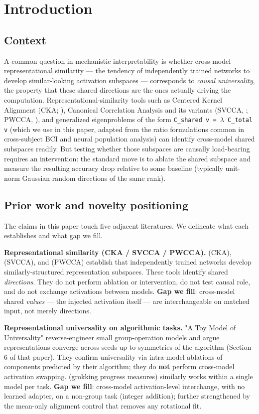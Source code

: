 \section{Introduction}

\subsection{Context}

A common question in mechanistic interpretability is whether
cross-model representational similarity --- the tendency of independently
trained networks to develop similar-looking activation subspaces ---
corresponds to \emph{causal universality}, the property that these shared
directions are the ones actually driving the computation.
Representational-similarity tools such as Centered Kernel Alignment
(CKA; \citet{kornblith2019cka}), Canonical Correlation Analysis and its
variants (SVCCA, \citet{raghu2017svcca}; PWCCA, \citet{morcos2018pwcca}), and
generalized eigenproblems of the form \texttt{C\_shared v = $\lambda$ C\_total v} (which
we use in this paper, adapted from the ratio formulations common in
cross-subject BCI and neural population analysis) can identify
cross-model shared subspaces readily. But testing whether those
subspaces are causally load-bearing requires an intervention: the
standard move is to ablate the shared subspace and measure the
resulting accuracy drop relative to some baseline (typically unit-norm
Gaussian random directions of the same rank).

\subsection{Prior work and novelty positioning}

The claims in this paper touch five adjacent literatures. We delineate
what each establishes and what gap we fill.

\textbf{Representational similarity (CKA / SVCCA / PWCCA).} \citet{kornblith2019cka} (CKA), \citet{raghu2017svcca} (SVCCA), and \citet{morcos2018pwcca}
(PWCCA) establish that independently trained networks develop
similarly-structured representation subspaces. These tools identify
shared \emph{directions}. They do not perform ablation or intervention, do
not test causal role, and do not exchange activations between models.
\textbf{Gap we fill}: cross-model shared \emph{values} --- the injected activation
itself --- are interchangeable on matched input, not merely directions.

\textbf{Representational universality on algorithmic tasks.} \citet{chughtai2023universality} "A Toy Model of Universality" reverse-engineer small
group-operation models and argue representations converge across seeds
up to symmetries of the algorithm (Section 6 of that paper). They
confirm universality via intra-model ablations of components predicted
by their algorithm; they do \textbf{not} perform cross-model activation
swapping. \citet{nanda2023grokking} (grokking progress measures) similarly
works within a single model per task. \textbf{Gap we fill}: cross-model
activation-level interchange, with no learned adapter, on a non-group
task (integer addition); further strengthened by the mean-only
alignment control that removes any rotational fit.

